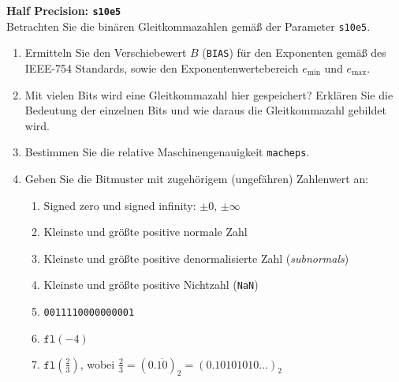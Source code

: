 \textbf{Half Precision: \texttt{s10e5}}\\
Betrachten Sie die binären Gleitkommazahlen gemäß der Parameter \texttt{s10e5}.
\begin{enumerate}
	\item Ermitteln Sie den Verschiebewert $B$ (\texttt{BIAS}) für den Exponenten gemäß des IEEE-754 Standards, sowie den Exponentenwertebereich $e_{\text{min}}$ und $e_{\text{max}}$.
	\item Mit vielen Bits wird eine Gleitkommazahl hier gespeichert? Erklären Sie die Bedeutung der einzelnen Bits und wie daraus die Gleitkommazahl gebildet wird.
	\item Bestimmen Sie die relative Maschinengenauigkeit \texttt{macheps}.
	\item Geben Sie die Bitmuster mit zugehörigem (ungefähren) Zahlenwert an:
	\begin{enumerate}
		\item Signed zero und signed infinity:  $\pm 0$, $\pm \infty$
		\item Kleinste und größte positive normale Zahl
		\item Kleinste und größte positive denormalisierte Zahl (\textit{subnormals})
		\item Kleinste und größte positive Nichtzahl (\texttt{NaN})
		\item \texttt{0011110000000001}
		\item $\texttt{fl}(-4)$
		\item $\texttt{fl}(\frac{2}{3})$, wobei $\frac{2}{3} = (0.\overline{10})_2=(0.10101010\ldots)_2$
	\end{enumerate}
\end{enumerate}